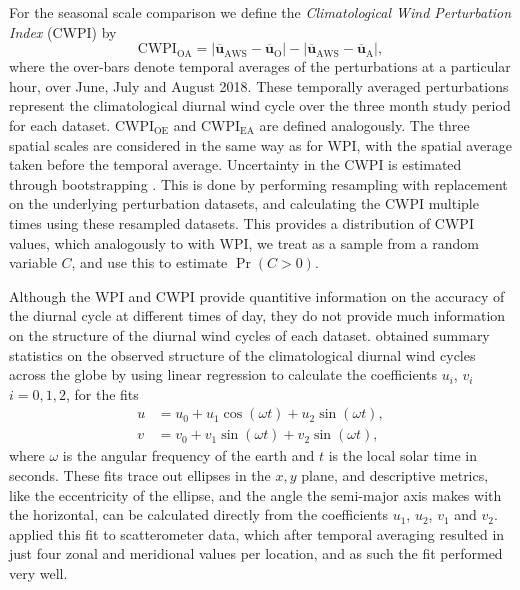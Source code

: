 \documentclass[twocol]{ametsoc}
\DeclareMathOperator{\pr}{Pr}
\begin{document}
For the seasonal scale comparison we define the \textit{Climatological Wind Perturbation Index} (CWPI) by
\begin{equation}
\text{CWPI}_{\text{OA}} = \left\lvert \overline{\boldsymbol{u}}_{\text{AWS}}-\overline{\boldsymbol{u}}_{\text{O}} \right\rvert - \left\lvert \overline{\boldsymbol{u}}_{\text{AWS}}-\overline{\boldsymbol{u}}_{\text{A}} \right\rvert,
\end{equation}
where the over-bars denote temporal averages of the perturbations at a particular hour, over June, July and August 2018. These temporally averaged perturbations represent the climatological diurnal wind cycle over the three month study period for each dataset. $\text{CWPI}_{\text{OE}}$ and $\text{CWPI}_{\text{EA}}$ are defined analogously. The three spatial scales are considered in the same way as for WPI, with the spatial average taken before the temporal average. Uncertainty in the CWPI is estimated through bootstrapping \citep{efron79}. This is done by performing resampling with replacement on the underlying perturbation datasets, and calculating the CWPI multiple times using these resampled datasets. This provides a distribution of CWPI values, which analogously to with WPI, we treat as a sample from a random variable $C$, and use this to estimate $\pr\left(C > 0\right)$.

Although the WPI and CWPI provide quantitive information on the accuracy of the diurnal cycle at different times of day, they do not provide much information on the structure of the diurnal wind cycles of each dataset. \citet{gille05} obtained summary statistics on the observed structure of the climatological diurnal wind cycles across the globe by using linear regression to calculate the coefficients $u_i$, $v_i$ $i=0,1,2$, for the fits 
\begin{align}
u &= u_0 + u_1 \cos(\omega t) + u_2 \sin(\omega t), \label{Eq:u_h} \\
v &= v_0 + v_1 \sin(\omega t) + v_2 \sin(\omega t), \label{Eq:v_h}
\end{align}
where $\omega$ is the angular frequency of the earth and $t$ is the local solar time in seconds. These fits trace out ellipses in the $x,y$ plane, and descriptive metrics, like the eccentricity of the ellipse, and the angle the semi-major axis makes with the horizontal, can be calculated directly from the coefficients $u_1$, $u_2$, $v_1$ and $v_2$. \citet{gille05} applied this fit to scatterometer data, which after temporal averaging resulted in just four zonal and meridional values per location, and as such the fit performed very well.  
\end{document}
